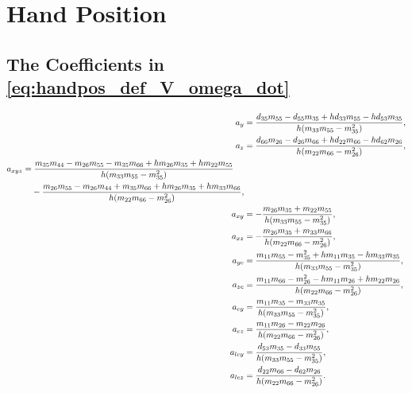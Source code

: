 \chapter{Hand Position}
\label{app:handpos}

\section{The Coefficients in \eqref{eq:handpos_def_V_omega_dot}}
\label{app:V_omega_dot}
\begin{subequations}
    \begin{align}
        a_y &= \frac{d_{35}m_{55} - d_{55}m_{35} + hd_{33}m_{55} - hd_{53}m_{35}}{h(m_{33}m_{55}-m_{35}^2)},\\
        a_z &= \frac{d_{66}m_{26}-d_{26}m_{66} + hd_{22}m_{66} - hd_{62}m_{26}}{h(m_{22}m_{66}- m_{26}^2)},\\
        \begin{split}
            a_{xyz} &= \frac{m_{35}m_{44} - m_{26}m_{55} - m_{35}m_{66} + hm_{26}m_{35} + hm_{22}m_{55}}{h(m_{33}m_{55}-m_{35}^2)}\\
            &\hphantom{=}\;- \frac{m_{26}m_{55} - m_{26}m_{44} + m_{35}m_{66} + hm_{26}m_{35} + hm_{33}m_{66}}{h(m_{22}m_{66}- m_{26}^2)},
        \end{split}\\
        a_{xy} &= -\frac{m_{26}m_{35} + m_{22}m_{55}}{h(m_{33}m_{55}- m_{35}^2)},\\
        a_{xz} &= -\frac{m_{26}m_{35} + m_{33}m_{66}}{h(m_{22}m_{66}- m_{26}^2)},\\
        a_{ye} &= \frac{m_{11}m_{55} - m_{35}^2 + hm_{11}m_{35} - hm_{33}m_{35}}{h(m_{33}m_{55}- m_{35}^2)},\\
        a_{ze} &= \frac{m_{11}m_{66} - m_{26}^2 - hm_{11}m_{26} + hm_{22}m_{26}}{h(m_{22}m_{66}- m_{26}^2)},\\
        a_{ey} &= \frac{m_{11}m_{35} - m_{33}m_{35}}{h(m_{33}m_{55}- m_{35}^2)},\\
        a_{ez} &= \frac{m_{11}m_{26} - m_{22}m_{26}}{h(m_{22}m_{66}- m_{26}^2)},\\
        a_{ley} &= \frac{d_{53}m_{35} - d_{33}m_{55}}{h(m_{33}m_{55}- m_{35}^2)},\\
        a_{lez} &= \frac{d_{22}m_{66} - d_{62}m_{26}}{h(m_{22}m_{66}- m_{26}^2)}.
    \end{align}
\end{subequations}

